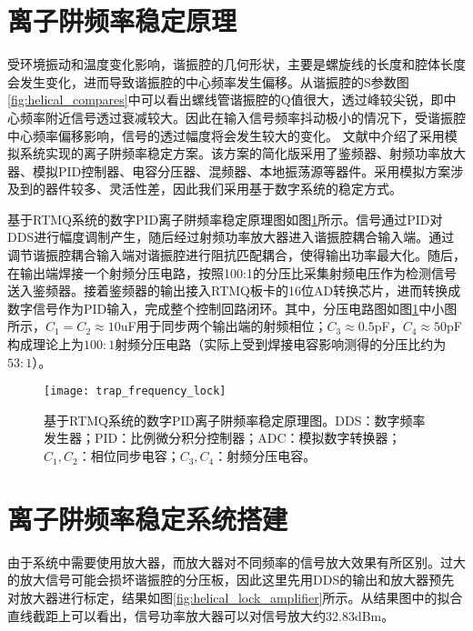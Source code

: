 


\section[离子阱频率稳定原理]{离子阱频率稳定原理}
受环境振动和温度变化影响，谐振腔的几何形状，主要是螺旋线的长度和腔体长度会发生变化，进而导致谐振腔的中心频率发生偏移。从谐振腔的S参数图\ref{fig:helical_compares}中可以看出螺线管谐振腔的Q值很大，透过峰较尖锐，即中心频率附近信号透过衰减较大。因此在输入信号频率抖动极小的情况下，受谐振腔中心频率偏移影响，信号的透过幅度将会发生较大的变化。
文献\cite[]{Johnson_Wong_Campos_Restelli_Landsman_Neyenhuis_Mizrahi_Monroe_2016}中介绍了采用模拟系统实现的离子阱频率稳定方案。该方案的简化版采用了鉴频器、射频功率放大器、模拟PID控制器、电容分压器、混频器、本地振荡源等器件。采用模拟方案涉及到的器件较多、灵活性差，因此我们采用基于数字系统的稳定方式。

基于RTMQ系统的数字PID离子阱频率稳定原理图如图\ref{fig:trap_frequency_lock}所示。信号通过PID对DDS进行幅度调制产生，随后经过射频功率放大器进入谐振腔耦合输入端。通过调节谐振腔耦合输入端对谐振腔进行阻抗匹配耦合，使得输出功率最大化。随后，在输出端焊接一个射频分压电路，按照100:1的分压比采集射频电压作为检测信号送入鉴频器。接着鉴频器的输出接入RTMQ板卡的16位AD转换芯片，进而转换成数字信号作为PID输入，完成整个控制回路闭环。其中，分压电路图如图\ref{fig:trap_frequency_lock}中小图所示，$C_1=C_2\approx10$uF用于同步两个输出端的射频相位；$C_3\approx0.5$pF，$C_4\approx50$pF构成理论上为$100:1$射频分压电路（实际上受到焊接电容影响测得的分压比约为$53:1$）。

\begin{figure}
    \centering
    \caption[数字PID离子阱频率稳定原理图]{基于RTMQ系统的数字PID离子阱频率稳定原理图。DDS：数字频率发生器；PID：比例微分积分控制器；ADC：模拟数字转换器；$C_1,C_2$：相位同步电容；$C_3,C_4$：射频分压电容。\label{fig:trap_frequency_lock}}
    \texttt{[image: trap\_frequency\_lock]}
\end{figure}


\section[离子阱频率稳定系统搭建]{离子阱频率稳定系统搭建}

由于系统中需要使用放大器，而放大器对不同频率的信号放大效果有所区别。过大的放大信号可能会损坏谐振腔的分压板，因此这里先用DDS的输出和放大器预先对放大器进行标定，结果如图\ref{fig:helical_lock_amplifier}所示。从结果图中的拟合直线截距上可以看出，信号功率放大器可以对信号放大约32.83dBm。

